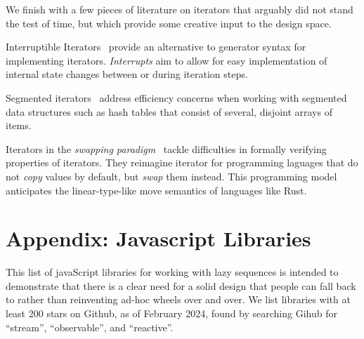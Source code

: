 \documentclass[sigplan,screen,10pt,review]{acmart}
\begin{document}
We finish with a few pieces of literature on iterators that arguably did not stand the test of time, but which provide some creative input to the design space.

Interruptible Iterators~\cite{liu2006interruptible} provide an alternative to generator syntax for implementing iterators. \textit{Interrupts} aim to allow for easy implementation of internal state changes between or during iteration steps.

Segmented iterators~\cite{austern2000segmented} address efficiency concerns when working with segmented data structures such as hash tables that consist of several, disjoint arrays of items.

Iterators in the \textit{swapping paradigm}~\cite{weide1994design} tackle difficulties in formally verifying properties of iterators. They reimagine iterator for programming laguages that do not \textit{copy} values by default, but \textit{swap} them instead. This programming model anticipates the linear-type-like move semantics of languages like Rust.




\appendix

\section{Appendix: Javascript Libraries}\label{wtfjs}

This list of javaScript libraries for working with lazy sequences is intended to demonstrate that there is a clear need for a solid design that people can fall back to rather than reinventing ad-hoc wheels over and over. We list libraries with at least 200 stars on Github, as of February 2024, found by searching Gihub for ``stream'', ``observable'', and ``reactive''.
\end{document}
